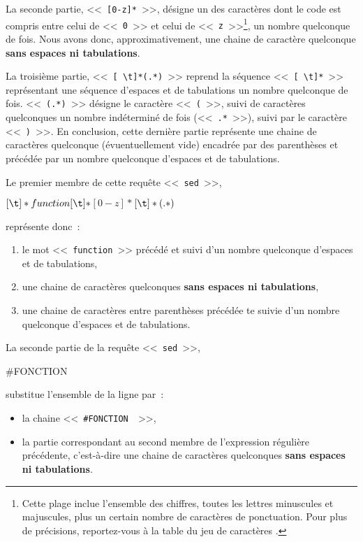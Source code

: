 \begin{example}
La seconde partie, <<~\verb=[0-z]*=~>>, d{\'e}signe un des caract{\`e}res dont le code {\ASCII} est compris entre celui de <<~{\tt 0}~>> et celui de <<~{\tt z}~>>\footnote{Cette plage inclue l'ensemble des chiffres, toutes les lettres minuscules et majuscules, plus un certain nombre de caract{\`e}res de ponctuation. Pour plus de pr{\'e}cisions, reportez-vous {\`a} la table du jeu de caract{\`e}res {\ASCII}.}, un nombre quelconque de fois.
Nous avons donc, approximativement, une chaine de caract{\`e}re quelconque {\bf sans espaces ni tabulations}.

La troisi{\`e}me partie, <<~\verb*=[ \t]*(.*)=~>> reprend la s{\'e}quence
<<~\verb*=[ \t]*=~>> repr{\'e}sentant une s{\'e}quence d'espaces et de tabulations un nombre quelconque de fois. <<~\verb*=(.*)=~>> d{\'e}signe le caract{\`e}re
<<~{\tt (}~>>, suivi de caract{\`e}res quelconques un nombre ind{\'e}termin{\'e} de fois (<<~\verb=.*=~>>), suivi par le caract{\`e}re <<~{\tt )}~>>. En conclusion, cette derni{\`e}re partie repr{\'e}sente une chaine de caract{\`e}res quelconque ({\'e}vuentuellement vide) encadr{\'e}e par des parenth{\`e}ses et pr{\'e}c{\'e}d{\'e}e par un nombre quelconque d'espaces et de tabulations.

Le premier membre de cette requ{\^e}te <<~{\tt sed}~>>,
\begin{center}
\begin{verbatim*}
\([ \t]*function[ \t]*\)\([0-z]*\)\([ \t]*(.*)\)
\end{verbatim*}
\end{center}
repr{\'e}sente donc~:
\begin{enumerate}
	\item	le mot <<~{\tt function}~>> pr{\'e}c{\'e}d{\'e} et suivi d'un nombre
			quelconque d'espaces et de tabulations,
	\item	une chaine de caract{\`e}res quelconques {\bf sans espaces ni
			tabulations},
	\item	une chaine de caract{\`e}res entre parenth{\`e}ses pr{\'e}c{\'e}d{\'e}e te suivie
			d'un nombre quelconque d'espaces et de tabulations.
\end{enumerate}

La seconde partie de la requ{\^e}te <<~{\tt sed}~>>,
\begin{center}
\begin{verbatim*}
#FONCTION \2
\end{verbatim*}
\end{center}
substitue l'ensemble de la ligne par~:
\begin{itemize}
	\item	la chaine <<~\verb*=#FONCTION =~>>,
	\item	la partie correspondant au second membre de l'expression
			r{\'e}guli{\`e}re pr{\'e}c{\'e}dente, c'est-{\`a}-dire une chaine de caract{\`e}res
			quelconques {\bf sans espaces ni tabulations}.
\end{itemize}
\end{example}

